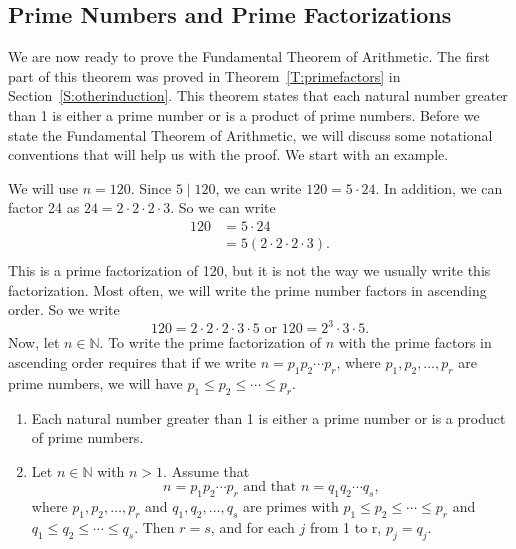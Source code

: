 \subsection*{Prime Numbers and Prime Factorizations}
We are now ready to prove the Fundamental Theorem of Arithmetic.  The first part of this theorem was proved in Theorem~\ref{T:primefactors} in Section~\ref{S:otherinduction}.  This theorem states that each natural number greater than 1 is either a prime number or is a product of prime numbers.  Before we state the Fundamental Theorem of Arithmetic, we will discuss some notational conventions that will help us with the proof.  We start with an example.

We will use  $n = 120$.  Since  $5 \mid 120$, we can write  $120 = 5 \cdot 24$.  In addition, we can factor 24 as  $24 = 2 \cdot 2 \cdot 2 \cdot 3$.  So we can write
\[
\begin{aligned}
  120 &= 5 \cdot 24 \\ 
      &= 5\left( {2 \cdot 2 \cdot 2 \cdot 3} \right). \\ 
\end{aligned} 
\]
This is a prime factorization of 120, but it is not the way we usually write this factorization.  Most often, we will write the prime number factors in ascending order.  So we write
\[
120 = 2 \cdot 2 \cdot 2 \cdot 3 \cdot 5\text{  or  }120 = 2^3  \cdot 3 \cdot 5.
\]
Now, let  $n \in \mathbb{N}$.  To write the prime factorization of  $n$ with the prime factors in ascending order requires that if we write  
$n = p_1 p_2  \cdots p_r $, where  $p_1 , p_2 ,  \ldots, p_r $ are prime numbers, we will have 
$p_1  \leq p_2  \leq  \cdots  \leq p_r $.
\hbreak
%
\begin{theorem} \label{T:fundtheorem}
%
 \hfill
\begin{enumerate}
\item Each natural number greater than 1 is either a prime number or is a product of prime numbers.

\item Let   $n \in \mathbb{N}$ with  $n > 1$.  Assume that
\[
n = p_1 p_2  \cdots p_r \text{  and that  }n = q_1 q_2  \cdots q_s,
\]
where  $p_1 , p_2 ,  \ldots, p_r $ and  $q_1 , q_2 ,  \ldots, q_s $ are primes with  
$p_1  \leq p_2  \leq  \cdots  \leq p_r $ and  
$q_1  \leq q_2  \leq  \cdots  \leq q_s $.  Then  $r = s$, and for each  $j$  from  1  to  r,  $p_j  = q_j $.
\end{enumerate}
\end{theorem}
